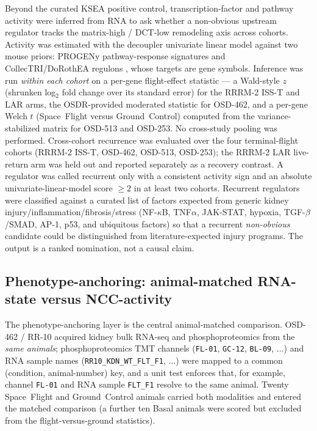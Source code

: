 \documentclass[11pt]{article}
\newcommand{\code}[1]{\texttt{#1}}
\newcommand{\ISS}{ISS-T\xspace}
\newcommand{\LAR}{LAR\xspace}
\begin{document}
Beyond the curated KSEA positive control, transcription-factor and pathway activity were inferred from RNA to ask whether a non-obvious upstream regulator tracks the matrix-high / DCT-low remodeling axis across cohorts. Activity was estimated with the decoupler univariate linear model \citep{badia2022decoupler} against two mouse priors: PROGENy pathway-response signatures \citep{schubert2018progeny} and CollecTRI/DoRothEA regulons \citep{garcia2019benchmark}, whose targets are gene symbols. Inference was run \emph{within each cohort} on a per-gene flight-effect statistic --- a Wald-style $z$ (shrunken log$_2$ fold change over its standard error) for the RRRM-2 \ISS{} and \LAR{} arms, the OSDR-provided moderated statistic for OSD-462, and a per-gene Welch $t$ (Space~Flight versus Ground~Control) computed from the variance-stabilized matrix for OSD-513 and OSD-253. No cross-study pooling was performed. Cross-cohort recurrence was evaluated over the four terminal-flight cohorts (RRRM-2 \ISS, OSD-462, OSD-513, OSD-253); the RRRM-2 \LAR{} live-return arm was held out and reported separately as a recovery contrast. A regulator was called recurrent only with a consistent activity sign and an absolute univariate-linear-model score $\geq 2$ in at least two cohorts. Recurrent regulators were classified against a curated list of factors expected from generic kidney injury/inflammation/fibrosis/stress (NF-$\kappa$B, TNF$\alpha$, JAK-STAT, hypoxia, TGF-$\beta$/SMAD, AP-1, p53, and ubiquitous factors) so that a recurrent \emph{non-obvious} candidate could be distinguished from literature-expected injury programs. The output is a ranked nomination, not a causal claim.

\subsection{Phenotype-anchoring: animal-matched RNA-state versus NCC-activity}

The phenotype-anchoring layer is the central animal-matched comparison. OSD-462 / RR-10 acquired kidney bulk RNA-seq and phosphoproteomics from the \emph{same animals}; phosphoproteomics TMT channels (\code{FL-01}, \code{GC-12}, \code{BL-09}, $\ldots$) and RNA sample names (\code{RR10\_KDN\_WT\_FLT\_F1}, $\ldots$) were mapped to a common (condition, animal-number) key, and a unit test enforces that, for example, channel \code{FL-01} and RNA sample \code{FLT\_F1} resolve to the same animal. Twenty Space~Flight and Ground~Control animals carried both modalities and entered the matched comparison (a further ten Basal animals were scored but excluded from the flight-versus-ground statistics).
\end{document}
